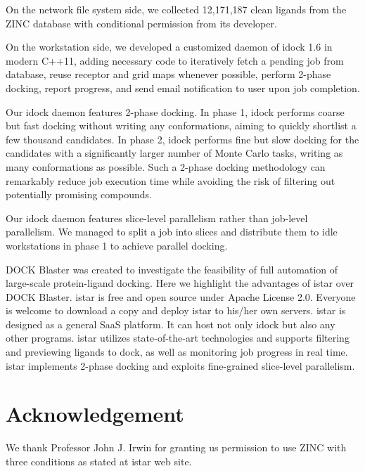 \documentclass{bioinfo}
\begin{document}
On the network file system side, we collected 12,171,187 clean ligands from the ZINC database \citep{532,1178} with conditional permission from its developer.

On the workstation side, we developed a customized daemon of idock 1.6 in modern C++11, adding necessary code to iteratively fetch a pending job from database, reuse receptor and grid maps whenever possible, perform 2-phase docking, report progress, and send email notification to user upon job completion.

Our idock daemon features 2-phase docking. In phase 1, idock performs coarse but fast docking without writing any conformations, aiming to quickly shortlist a few thousand candidates. In phase 2, idock performs fine but slow docking for the candidates with a significantly larger number of Monte Carlo tasks, writing as many conformations as possible. Such a 2-phase docking methodology can remarkably reduce job execution time while avoiding the risk of filtering out potentially promising compounds.

Our idock daemon features slice-level parallelism rather than job-level parallelism. We managed to split a job into slices and distribute them to idle workstations in phase 1 to achieve parallel docking.

DOCK Blaster \citep{557} was created to investigate the feasibility of full automation of large-scale protein-ligand docking. Here we highlight the advantages of istar over DOCK Blaster. istar is free and open source under Apache License 2.0. Everyone is welcome to download a copy and deploy istar to his/her own servers. istar is designed as a general SaaS platform. It can host not only idock but also any other programs. istar utilizes state-of-the-art technologies and supports filtering and previewing ligands to dock, as well as monitoring job progress in real time. istar implements 2-phase docking and exploits fine-grained slice-level parallelism.

\section*{Acknowledgement}

We thank Professor John J. Irwin for granting us permission to use ZINC with three conditions as stated at istar web site.



\end{document}
